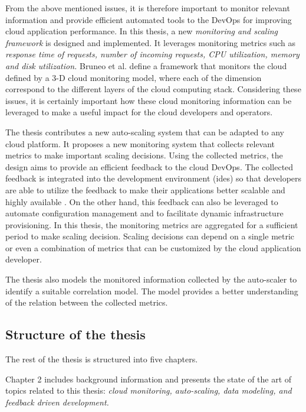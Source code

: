 \documentclass[article,type=msc,colorback,12pt,accentcolor=tud8b,table]{tudthesis}
\begin{document}
	From the above mentioned issues, it is therefore important to monitor relevant information and provide efficient automated tools to the DevOps for improving cloud application performance. In this thesis, a new \textit{monitoring and scaling framework} is designed and implemented. It leverages monitoring metrics such as \textit{response time of requests, number of incoming requests, CPU utilization, memory and disk utilization.} Bruneo et al.\cite{bruneo2015framework} define a framework that monitors the cloud defined by a 3-D cloud monitoring model, where each of the dimension correspond to the different layers of the cloud computing stack. Considering these issues, it is certainly important how these cloud monitoring information can be leveraged to make a useful impact for the cloud developers and operators. 
	
	The thesis contributes a new auto-scaling system that can be adapted to any cloud platform. It proposes a new monitoring system that collects relevant metrics to make important scaling decisions. Using the collected metrics, the design aims to provide an efficient feedback to the cloud DevOps. The collected feedback is integrated into the development environment (\gls{ide}s) so that developers are able to utilize the feedback to make their applications better scalable and highly available \cite{cito2015runtime}. On the other hand, this feedback can also be leveraged to automate configuration management and to facilitate dynamic infrastructure provisioning. In this thesis, the monitoring metrics are aggregated for a sufficient period to make scaling decision. Scaling decisions can depend on a single metric or even a combination of metrics that can be customized by the cloud application developer. 
	
	The thesis also models the monitored information collected by the auto-scaler to identify a suitable correlation model. The model provides a better understanding of the relation between the collected metrics. 
	
	\subsection{Structure of the thesis}

	\par The rest of the thesis is structured into five chapters.
	
	Chapter 2 includes background information and presents the state of the art of topics related to this thesis: \textit{cloud monitoring, auto-scaling, data modeling, and feedback driven development.} 
	
\end{document}
